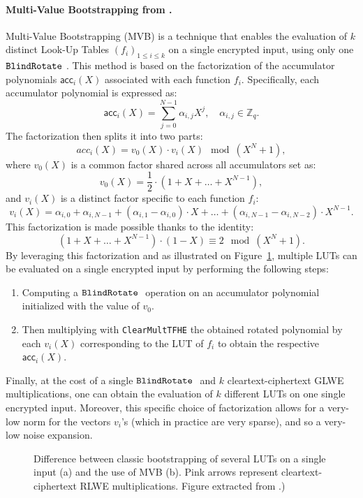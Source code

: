 \paragraph{Multi-Value Bootstrapping from \cite{RSA:CarIzaMol19}.}
\label{primitive:mvb}
%
Multi-Value Bootstrapping (MVB) is a technique that enables the evaluation of $k$ distinct Look-Up Tables $(f_i)_{1 \le i \le k}$ on a single encrypted input, using only one $\texttt{BlindRotate}~$. This method is based on the factorization of the accumulator polynomials $\textsf{acc}_i(X)$ associated with each function $f_i$. Specifically, each accumulator polynomial is expressed as: 
$$
    \textsf{acc}_i(X) = \sum_{j=0}^{N-1} \alpha_{i,j} X^j, \quad \alpha_{i,j} \in \mathbb{Z}_q.
$$
The factorization then splits it into two parts: 
$$
    acc_i(X) = v_0(X) \cdot v_i(X) \mod (X^N + 1),
$$
where $v_0(X)$ is a common factor shared across all accumulators set as:
$$
    v_0(X) = \frac{1}{2} \cdot (1 + X + \dots + X^{N-1}),
$$
and $v_i(X)$ is a distinct factor specific to each function $f_i$:
$$
    v_i(X) = \alpha_{i, 0} + \alpha_{i, N-1} + (\alpha_{i, 1} - \alpha_{i, 0}) \cdot X + \dots + (\alpha_{i, N-1} - \alpha_{i, N-2}) \cdot X^{N-1}.
$$
This factorization is made possible thanks to the identity:
$$
(1 + X + \dots + X^{N-1}) \cdot (1-X) \equiv 2 \mod (X^N + 1).
$$
By leveraging this factorization and as illustrated on Figure~\ref{fig:mvb}, multiple LUTs can be evaluated on a single encrypted input by performing the following steps:
\begin{enumerate}
\item Computing a $\texttt{BlindRotate}~$ operation on an accumulator polynomial initialized with the value of $v_0$.
\item Then multiplying with \texttt{ClearMultTFHE} the obtained rotated polynomial by each $v_i(X)$ corresponding to the LUT of $f_i$ to obtain the respective $\textsf{acc}_i(X)$.
\end{enumerate}
Finally, at the cost of a single $\texttt{BlindRotate}~$ and $k$ cleartext-ciphertext GLWE multiplications, one can obtain the evaluation of $k$ different LUTs on one single encrypted input. Moreover, this specific choice of factorization allows for a very-low norm for the vectors $v_i$'s (which in practice are very sparse), and so a very-low noise expansion.

\begin{figure}
    \centering
    \caption{Difference between classic bootstrapping of several LUTs on a single input (a) and the use of MVB (b). Pink arrows represent cleartext-ciphertext RLWE multiplications. Figure extracted from \cite{DBLP:conf/wahc/TramaCBS23}.)}
    \label{fig:mvb}
\end{figure}

